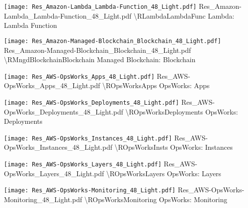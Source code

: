  {\texttt{[image: Res\_Amazon-Lambda\_Lambda-Function\_48\_Light.pdf]}} {Res\_Amazon-Lambda\_Lambda-Function\_48\_Light.pdf} {{\textbackslash}RLambdaLambdaFunc} {Lambda: Lambda Function}

 {\texttt{[image: Res\_Amazon-Managed-Blockchain\_Blockchain\_48\_Light.pdf]}} {Res\_Amazon-Managed-Blockchain\_Blockchain\_48\_Light.pdf} {{\textbackslash}RMngdBlockchainBlockchain} {Managed Blockchain: Blockchain}

 {\texttt{[image: Res\_AWS-OpsWorks\_Apps\_48\_Light.pdf]}} {Res\_AWS-OpsWorks\_Apps\_48\_Light.pdf} {{\textbackslash}ROpsWorksApps} {OpsWorks: Apps}

 {\texttt{[image: Res\_AWS-OpsWorks\_Deployments\_48\_Light.pdf]}} {Res\_AWS-OpsWorks\_Deployments\_48\_Light.pdf} {{\textbackslash}ROpsWorksDeployments} {OpsWorks: Deployments}

 {\texttt{[image: Res\_AWS-OpsWorks\_Instances\_48\_Light.pdf]}} {Res\_AWS-OpsWorks\_Instances\_48\_Light.pdf} {{\textbackslash}ROpsWorksInsts} {OpsWorks: Instances}

 {\texttt{[image: Res\_AWS-OpsWorks\_Layers\_48\_Light.pdf]}} {Res\_AWS-OpsWorks\_Layers\_48\_Light.pdf} {{\textbackslash}ROpsWorksLayers} {OpsWorks: Layers}

 {\texttt{[image: Res\_AWS-OpsWorks-Monitoring\_48\_Light.pdf]}} {Res\_AWS-OpsWorks-Monitoring\_48\_Light.pdf} {{\textbackslash}ROpsWorksMonitoring} {OpsWorks: Monitoring}

